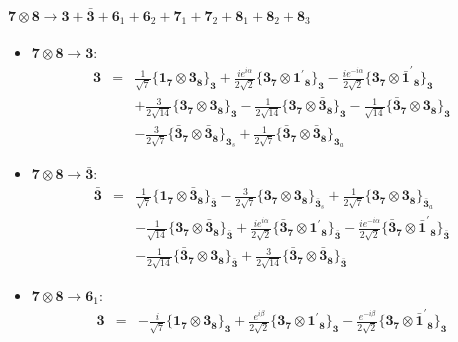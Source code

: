\documentclass[english]{article}
\newcommand{\subcg}[3]{\big\{ {#1}\otimes{#2}\big\}^{}_{#3}}
\newcommand{\rep}[1]{\mathbf{#1}}
\begin{document}
\paragraph*{\Large $\rep{7}\otimes\rep{8}\to\rep{3}+\rep{\bar{3}}+\rep{6}_{1}+\rep{6}_{2}+\rep{7}_{1}+\rep{7}_{2}+\rep{8}_{1}+\rep{8}_{2}+\rep{8}_{3}$}
\begin{itemize}
\item $\rep{7}\otimes\rep{8}\to\rep{3}$:
\begin{eqnarray*}
\rep{3} &=& \frac{1}{\sqrt{7}}\subcg{\rep{1}_{\rep{7}}}{\rep{3}_{\rep{8}}}{\rep{3}}+\frac{i e^{i \alpha }}{2 \sqrt{2}}\subcg{\rep{3}_{\rep{7}}}{\rep{1^{\prime}}_{\rep{8}}}{\rep{3}}-\frac{i e^{-i \alpha }}{2 \sqrt{2}}\subcg{\rep{3}_{\rep{7}}}{\rep{\bar{1}^{\prime}}_{\rep{8}}}{\rep{3}} \\ 
 & & +\frac{3}{2 \sqrt{14}}\subcg{\rep{3}_{\rep{7}}}{\rep{3}_{\rep{8}}}{\rep{3}}-\frac{1}{2 \sqrt{14}}\subcg{\rep{3}_{\rep{7}}}{\rep{\bar{3}}_{\rep{8}}}{\rep{3}}-\frac{1}{\sqrt{14}}\subcg{\rep{\bar{3}}_{\rep{7}}}{\rep{3}_{\rep{8}}}{\rep{3}} \\ 
 & & -\frac{3}{2 \sqrt{7}}\subcg{\rep{\bar{3}}_{\rep{7}}}{\rep{\bar{3}}_{\rep{8}}}{\rep{3}_{s}}+\frac{1}{2 \sqrt{7}}\subcg{\rep{\bar{3}}_{\rep{7}}}{\rep{\bar{3}}_{\rep{8}}}{\rep{3}_{a}}
\end{eqnarray*}
\item $\rep{7}\otimes\rep{8}\to\rep{\bar{3}}$:
\begin{eqnarray*}
\rep{\bar{3}} &=& \frac{1}{\sqrt{7}}\subcg{\rep{1}_{\rep{7}}}{\rep{\bar{3}}_{\rep{8}}}{\rep{\bar{3}}}-\frac{3}{2 \sqrt{7}}\subcg{\rep{3}_{\rep{7}}}{\rep{3}_{\rep{8}}}{\rep{\bar{3}}_{s}}+\frac{1}{2 \sqrt{7}}\subcg{\rep{3}_{\rep{7}}}{\rep{3}_{\rep{8}}}{\rep{\bar{3}}_{a}} \\ 
 & & -\frac{1}{\sqrt{14}}\subcg{\rep{3}_{\rep{7}}}{\rep{\bar{3}}_{\rep{8}}}{\rep{\bar{3}}}+\frac{i e^{i \alpha }}{2 \sqrt{2}}\subcg{\rep{\bar{3}}_{\rep{7}}}{\rep{1^{\prime}}_{\rep{8}}}{\rep{\bar{3}}}-\frac{i e^{-i \alpha }}{2 \sqrt{2}}\subcg{\rep{\bar{3}}_{\rep{7}}}{\rep{\bar{1}^{\prime}}_{\rep{8}}}{\rep{\bar{3}}} \\ 
 & & -\frac{1}{2 \sqrt{14}}\subcg{\rep{\bar{3}}_{\rep{7}}}{\rep{3}_{\rep{8}}}{\rep{\bar{3}}}+\frac{3}{2 \sqrt{14}}\subcg{\rep{\bar{3}}_{\rep{7}}}{\rep{\bar{3}}_{\rep{8}}}{\rep{\bar{3}}}
\end{eqnarray*}
\item $\rep{7}\otimes\rep{8}\to\rep{6}_{1}$:
\begin{eqnarray*}
\rep{3} &=& -\frac{i}{\sqrt{7}}\subcg{\rep{1}_{\rep{7}}}{\rep{3}_{\rep{8}}}{\rep{3}}+\frac{e^{i \beta }}{2 \sqrt{2}}\subcg{\rep{3}_{\rep{7}}}{\rep{1^{\prime}}_{\rep{8}}}{\rep{3}}-\frac{e^{-i \beta }}{2 \sqrt{2}}\subcg{\rep{3}_{\rep{7}}}{\rep{\bar{1}^{\prime}}_{\rep{8}}}{\rep{3}} \\ 

\end{eqnarray*}
\end{itemize}
\end{document}
